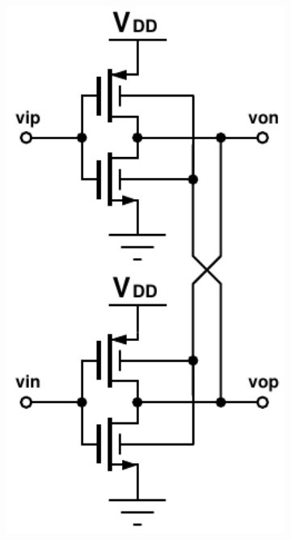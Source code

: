 			\begin{figure}[htb!]
			    \centering
			    \begin{subfigure}{0.3\textwidth}
			        \centering
			        \includegraphics[width=1\textwidth, angle=0]{./figs/design/pseudodiff_bw}
			        \caption{ }
			        \label{fig:pseudodiff_cir}
			    \end{subfigure}%

\end{figure}

